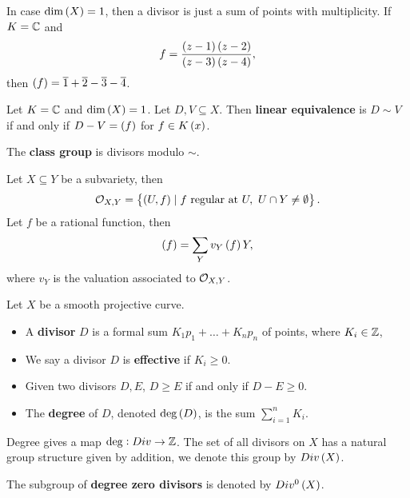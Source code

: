 \begin{example}
In case $ \dim\br{X} = 1 $, then a divisor is just a sum of points with multiplicity. If $ K = \mathbb{C} $ and
$$ f = \dfrac{\br{z - 1}\br{z - 2}}{\br{z - 3}\br{z - 4}}, $$
then $ \br{f} = \overline{1} + \overline{2} - \overline{3} - \overline{4} $.
\end{example}

\begin{definition}
Let $ K = \mathbb{C} $ and $ \dim\br{X} = 1 $. Let $ D, V \subseteq X $. Then \textbf{linear equivalence} is $ D \sim V $ if and only if $ D - V = \br{f} $ for $ f \in K\br{x} $.
\end{definition}

\begin{definition}
The \textbf{class group} is divisors modulo $ \sim $.
\end{definition}

\begin{definition}
Let $ X \subseteq Y $ be a subvariety, then
$$ \OO_{X, Y} = \cbr{\br{U, f} \mid f \ \text{regular at} \ U, \ U \cap Y \ne \emptyset}. $$
Let $ f $ be a rational function, then
$$ \br{f} = \sum_Y v_Y\br{f}Y, $$
where $ v_Y $ is the valuation associated to $ \mathcal{O}_{X, Y} $.
\end{definition}


\begin{definition}
Let $ X $ be a smooth projective curve.
\begin{itemize}
\item A \textbf{divisor} $ D $ is a formal sum $ K_1p_1 + \dots + K_np_n $ of points, where $ K_i \in \mathbb{Z} $,
\item We say a divisor $ D $ is \textbf{effective} if $ K_i \ge 0 $.
\item Given two divisors $ D, E $, $ D \ge E $ if and only if $ D - E \ge 0 $.
\item The \textbf{degree} of $ D $, denoted $ \deg\br{D} $, is the sum $ \sum_{i = 1}^n K_i $.
\end{itemize}
\end{definition}

\begin{remark}
Degree gives a map $ \deg : Div \to \mathbb{Z} $. The set of all divisors on $ X $ has a natural group structure given by addition, we denote this group by $ Div\br{X} $.
\end{remark}

\begin{notation}
The subgroup of \textbf{degree zero divisors} is denoted by $ Div^0\br{X} $.
\end{notation}

